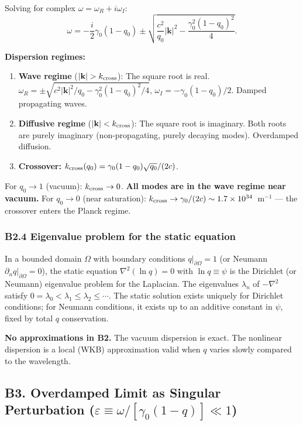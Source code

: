 \documentclass[reprint]{revtex4-2}
\begin{document}
Solving for complex $\omega = \omega_R + i\omega_I$:
\begin{equation}
\omega = -\frac{i}{2}\gamma_0(1-q_0) \pm \sqrt{\frac{c^2}{q_0}|\mathbf{k}|^2 - \frac{\gamma_0^2(1-q_0)^2}{4}}.
\label{eq:nonlinear_dispersion}
\end{equation}

\textbf{Dispersion regimes:}
\begin{enumerate}[label=(\roman*)]
\item \textbf{Wave regime} ($|\mathbf{k}| > k_{\rm cross}$): The square root is real. $\omega_R = \pm\sqrt{c^2|\mathbf{k}|^2/q_0 - \gamma_0^2(1-q_0)^2/4}$, $\omega_I = -\gamma_0(1-q_0)/2$. Damped propagating waves.
\item \textbf{Diffusive regime} ($|\mathbf{k}| < k_{\rm cross}$): The square root is imaginary. Both roots are purely imaginary (non-propagating, purely decaying modes). Overdamped diffusion.
\item \textbf{Crossover:} $k_{\rm cross}(q_0) = \gamma_0(1-q_0)\sqrt{q_0}/(2c)$.
\end{enumerate}

For $q_0\to 1$ (vacuum): $k_{\rm cross} \to 0$. \textbf{All modes are in the wave regime near vacuum.} For $q_0\to 0$ (near saturation): $k_{\rm cross} \to \gamma_0/(2c) \sim 1.7\times 10^{34}$~m$^{-1}$ --- the crossover enters the Planck regime.

\subsubsection{B2.4 Eigenvalue problem for the static equation}

In a bounded domain $\Omega$ with boundary conditions $q|_{\partial\Omega}=1$ (or Neumann $\partial_n q|_{\partial\Omega}=0$), the static equation $\nabla^2(\ln q)=0$ with $\ln q\equiv\psi$ is the Dirichlet (or Neumann) eigenvalue problem for the Laplacian. The eigenvalues $\lambda_n$ of $-\nabla^2$ satisfy $0=\lambda_0<\lambda_1\le\lambda_2\le\cdots$. The static solution exists uniquely for Dirichlet conditions; for Neumann conditions, it exists up to an additive constant in $\psi$, fixed by total $q$ conservation.

\textbf{No approximations in B2.} The vacuum dispersion is exact. The nonlinear dispersion is a local (WKB) approximation valid when $q$ varies slowly compared to the wavelength.

\subsection{B3. Overdamped Limit as Singular Perturbation ($\varepsilon \equiv \omega/[\gamma_0(1-q)] \ll 1$)}
\end{document}
